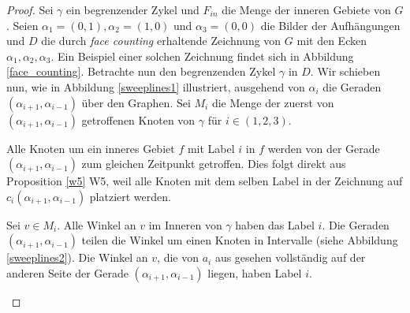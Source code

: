 \begin{proof}
Sei $\gamma$ ein begrenzender Zykel und $F_{in}$ die Menge der inneren Gebiete von $G$. Seien $\alpha_1=(0,1),\alpha_2=(1,0)$ und $\alpha_3=(0,0)$ die Bilder der Aufhängungen und $D$ die durch \textit{face counting} erhaltende Zeichnung von $G$ mit den Ecken $\alpha_1,\alpha_2,\alpha_3$. Ein Beispiel einer solchen Zeichnung findet sich in Abbildung \ref{face_counting}. Betrachte nun den begrenzenden Zykel $\gamma$ in $D$. Wir schieben nun, wie in Abbildung \ref{sweeplines1} illustriert, ausgehend von $\alpha_i$ die Geraden $(\alpha_{i+1},\alpha_{i-1})$ über den Graphen. Sei $M_i$ die Menge der zuerst von $(\alpha_{i+1},\alpha_{i-1})$ getroffenen Knoten von $\gamma$ für $i \in (1,2,3)$.

\begin{observation}\label{obs1}
Alle Knoten um ein inneres Gebiet $f$ mit Label $i$ in $f$ werden von der Gerade $(\alpha_{i+1},\alpha_{i-1})$ zum gleichen Zeitpunkt getroffen. Dies folgt direkt aus Proposition \ref{w5} W5, weil alle Knoten mit dem selben Label in der Zeichnung auf $c_i(\alpha_{i+1},\alpha_{i-1})$ platziert werden.
\end{observation}

\begin{observation}\label{obs2}
Sei $v \in M_i$. Alle Winkel an $v$ im Inneren von $\gamma$ haben das Label $i$. Die Geraden $(\alpha_{i+1},\alpha_{i-1})$ teilen die Winkel um einen Knoten in Intervalle (siehe Abbildung \ref{sweeplines2}). Die Winkel an $v$, die von $a_i$ aus gesehen vollständig auf der anderen Seite der Gerade $(\alpha_{i+1},\alpha_{i-1})$ liegen, haben Label $i$.
\end{observation}

\captionsetup{format=plain,labelsep=endash,justification=raggedright,width=.47\textwidth}


\end{proof}
